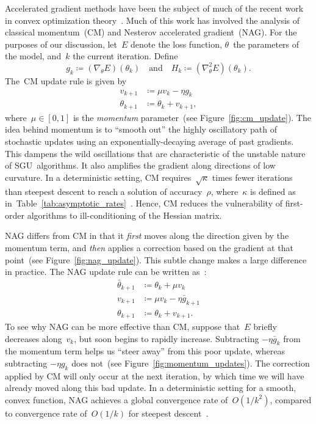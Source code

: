 \documentclass[11pt,a4paper]{article}
\numberwithin{equation}{section}
\begin{document}
Accelerated gradient methods have been the subject of much of the recent work in
convex optimization theory~\citep{sutskever2013importance}. Much of this work
has involved the analysis of classical momentum~(CM) and Nesterov accelerated
gradient~(NAG). For the purposes of our discussion, let~$E$ denote the loss
function, $\theta$~the parameters of the model, and~$k$ the current iteration.
Define
\[
	g_k \coloneqq (\nabla_\theta E)(\theta_k)
	\quad\text{and}\quad
	H_k \coloneqq (\nabla^2_\theta E)(\theta_k).
\]
The~CM update rule is given by
\begin{align*}
	v_{k + 1} &\coloneqq \mu v_k - \eta g_k \\
	\theta_{k + 1} &\coloneqq \theta_k + v_{k + 1},
\end{align*}
where~$\mu \in [0, 1]$ is the \emph{momentum} parameter~(see
Figure~\ref{fig:cm_update}). The idea behind momentum is to ``smooth out'' the
highly oscillatory path of stochastic updates using an exponentially-decaying
average of past gradients. This dampens the wild oscillations that are
characteristic of the unstable nature of SGU~algorithms. It also amplifies the
gradient along directions of low curvature. In a deterministic setting, CM
requires~$\sqrt{\kappa}$ times fewer iterations than steepest descent to reach a
solution of accuracy~$\rho$, where~$\kappa$ is defined as
in~Table~\ref{tab:asymptotic_rates}~\citep{sutskever2013importance}.  Hence, CM
reduces the vulnerability of first-order algorithms to ill-conditioning of the
Hessian matrix.

NAG differs from CM in that it \emph{first} moves along the direction given by
the momentum term, and \emph{then} applies a correction based on the gradient at
that point~(see Figure~\ref{fig:nag_update}). This subtle change makes a large
difference in practice. The NAG update rule can be written
as~\citep{sutskever2013importance}:
\begin{align*}
	\bar{\theta}_{k + 1} &\coloneqq \theta_k + \mu v_k \\
	v_{k + 1} &\coloneqq \mu v_k - \eta \bar{g}_{k + 1} \\
	\theta_{k + 1} &\coloneqq \theta_k + v_{k + 1}.
\end{align*}
To see why NAG can be more effective than CM, suppose that~$E$ briefly decreases
along~$v_k$, but soon begins to rapidly increase. Subtracting $-\eta \bar{g}_k$
from the momentum term helps us ``steer away'' from this poor update, whereas
subtracting $-\eta g_k$ does not~(see Figure~\ref{fig:momentum_updates}). The
correction applied by CM will only occur at the next iteration, by which time we
will have already moved along this bad update. In a deterministic setting for a
smooth, convex function, NAG achieves a global convergence rate of~$O(1 / k^2)$,
compared to convergence rate of~$O(1 / k)$ for steepest
descent~\citep{sutskever2013importance}.
\end{document}
